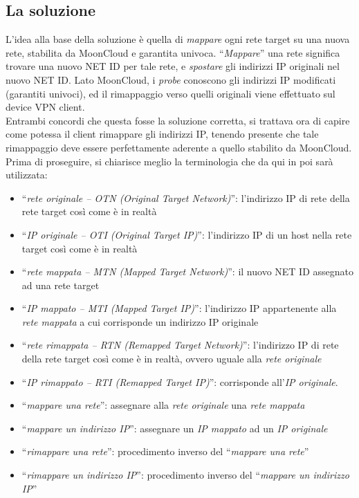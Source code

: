 \subsection{La soluzione}
L'idea alla base della soluzione è quella di \textit{mappare} ogni rete target
su una nuova rete, stabilita da MoonCloud e garantita univoca.
``\textit{Mappare}'' una rete significa trovare una nuovo NET ID per tale rete, e
\textit{spostare} gli indirizzi IP originali nel nuovo NET ID. Lato MoonCloud, i
\textit{probe} conoscono gli indirizzi IP modificati (garantiti univoci), ed il rimappaggio
verso quelli originali viene effettuato sul device VPN client.\\
Entrambi concordi che questa fosse la soluzione corretta, si trattava ora di capire
come potessa il client rimappare gli indirizzi IP, tenendo presente che tale
rimappaggio deve essere perfettamente aderente a quello stabilito da MoonCloud.
Prima di proseguire, si chiarisce meglio la terminologia che da qui in poi sarà utilizzata:
\begin{itemize}
  \item ``\textit{rete originale -- OTN (Original Target Network)}'': l'indirizzo IP di rete della rete target così come
  è in realtà
  \item ``\textit{IP originale -- OTI (Original Target IP)}'': l'indirizzo IP di un
  host nella rete target così
  come è in realtà
  \item ``\textit{rete mappata -- MTN (Mapped Target Network)}'': il nuovo NET ID
  assegnato ad una rete target
  \item ``\textit{IP mappato -- MTI (Mapped Target IP)}'': l'indirizzo IP appartenente alla \textit{rete
  mappata} a cui corrisponde un indirizzo IP originale
  \item ``\textit{rete rimappata -- RTN (Remapped Target Network)}'':  l'indirizzo
  IP di rete della rete target così
  come è in realtà, ovvero uguale alla \textit{rete originale}
  \item ``\textit{IP rimappato -- RTI (Remapped Target IP)}'': corrisponde all'\textit{IP originale}.
  \item ``\textit{mappare una rete}'': assegnare alla \textit{rete originale} una
  \textit{rete mappata}
  \item ``\textit{mappare un indirizzo IP}'': assegnare un \textit{IP mappato}
  ad un \textit{IP originale}
  \item ``\textit{rimappare una rete}'': procedimento inverso del
  ``\textit{mappare una rete}''
  \item ``\textit{rimappare un indirizzo IP}'': procedimento inverso del
  ``\textit{mappare un indirizzo IP}''
\end{itemize}

